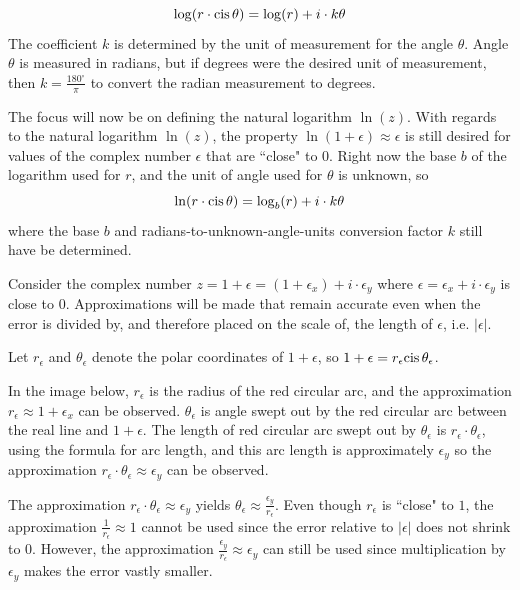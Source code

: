 \documentclass{article}
\newcommand{\cis}{\textnormal{cis}\,}
\begin{document}
\[\log(r \cdot \cis\theta) = \log(r) + i \cdot k\theta\]
The coefficient \(k\) is determined by the unit of measurement for the angle \(\theta\). Angle \(\theta\) is measured in radians, but if degrees were the desired unit of measurement, then \(k = \frac{180^\circ}{\pi}\) to convert the radian measurement to degrees.

The focus will now be on defining the natural logarithm \(\ln(z)\). With regards to the natural logarithm \(\ln(z)\), the property \(\ln(1 + \epsilon) \approx \epsilon\) is still desired for values of the complex number \(\epsilon\) that are ``close" to \(0\). Right now the base \(b\) of the logarithm used for \(r\), and the unit of angle used for \(\theta\) is unknown, so
\[\ln(r \cdot \cis\theta) = \log_b(r) + i \cdot k\theta\]
where the base \(b\) and radians-to-unknown-angle-units conversion factor \(k\) still have be determined. 

Consider the complex number \(z = 1 + \epsilon = (1 + \epsilon_x) + i \cdot \epsilon_y\) where \(\epsilon = \epsilon_x + i \cdot \epsilon_y\) is close to \(0\). Approximations will be made that remain accurate even when the error is divided by, and therefore placed on the scale of, the length of \(\epsilon\), i.e. \(|\epsilon|\). 

Let \(r_\epsilon\) and \(\theta_\epsilon\) denote the polar coordinates of \(1 + \epsilon\), so \(1 + \epsilon = r_\epsilon\cis\theta_\epsilon\). 

In the image below, \(r_\epsilon\) is the radius of the red circular arc, and the approximation \(r_\epsilon \approx 1 + \epsilon_x\) can be observed. \(\theta_\epsilon\) is angle swept out by the red circular arc between the real line and \(1 + \epsilon\). The length of red circular arc swept out by \(\theta_\epsilon\) is \(r_\epsilon \cdot \theta_\epsilon\), using the formula for arc length, and this arc length is approximately \(\epsilon_y\) so the approximation \(r_\epsilon \cdot \theta_\epsilon \approx \epsilon_y\) can be observed.  

The approximation \(r_\epsilon \cdot \theta_\epsilon \approx \epsilon_y\) yields \(\theta_\epsilon \approx \frac{\epsilon_y}{r_\epsilon}\). Even though \(r_\epsilon\) is ``close" to \(1\), the approximation \(\frac{1}{r_\epsilon} \approx 1\) cannot be used since the error relative to \(|\epsilon|\) does not shrink to \(0\). However, the approximation \(\frac{\epsilon_y}{r_\epsilon} \approx \epsilon_y\) can still be used since multiplication by \(\epsilon_y\) makes the error vastly smaller.
\end{document}
